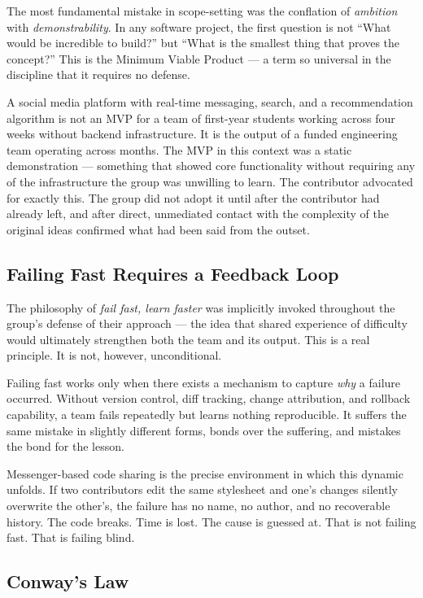 \documentclass[11pt,a4paper]{book}
\begin{document}
The most fundamental mistake in scope-setting was the conflation of \emph{ambition} with \emph{demonstrability}. In any software project, the first question is not ``What would be incredible to build?'' but ``What is the smallest thing that proves the concept?'' This is the Minimum Viable Product --- a term so universal in the discipline that it requires no defense.
 
A social media platform with real-time messaging, search, and a recommendation algorithm is not an MVP for a team of first-year students working across four weeks without backend infrastructure. It is the output of a funded engineering team operating across months. The MVP in this context was a static demonstration --- something that showed core functionality without requiring any of the infrastructure the group was unwilling to learn. The contributor advocated for exactly this. The group did not adopt it until after the contributor had already left, and after direct, unmediated contact with the complexity of the original ideas confirmed what had been said from the outset.
 
\subsection{Failing Fast Requires a Feedback Loop}
 
The philosophy of \emph{fail fast, learn faster} was implicitly invoked throughout the group's defense of their approach --- the idea that shared experience of difficulty would ultimately strengthen both the team and its output. This is a real principle. It is not, however, unconditional.
 
Failing fast works only when there exists a mechanism to capture \emph{why} a failure occurred. Without version control, diff tracking, change attribution, and rollback capability, a team fails repeatedly but learns nothing reproducible. It suffers the same mistake in slightly different forms, bonds over the suffering, and mistakes the bond for the lesson.
 
Messenger-based code sharing is the precise environment in which this dynamic unfolds. If two contributors edit the same stylesheet and one's changes silently overwrite the other's, the failure has no name, no author, and no recoverable history. The code breaks. Time is lost. The cause is guessed at. That is not failing fast. That is failing blind.
 
\subsection{Conway's Law}
 
\end{document}
